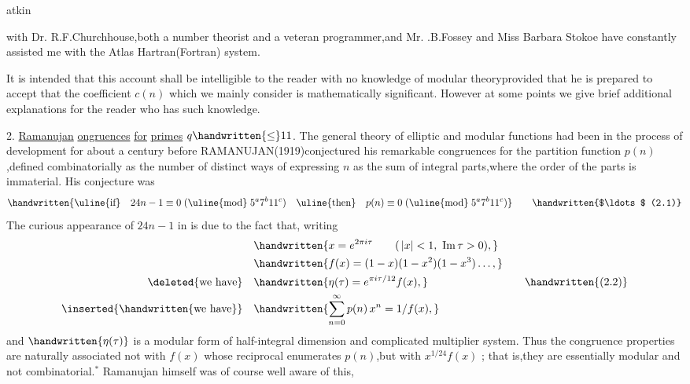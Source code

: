 \noindent\hfill atkin 

\noindent with Dr. R.F.Churchhouse,both a number theorist and a veteran programmer,and Mr. .B.Fossey and Miss Barbara Stokoe have constantly assisted me with the Atlas Hartran(Fortran) system.

It is intended that this account shall be intelligible to the reader with no knowledge of modular theory\deleted{;}provided that he is prepared to accept that the coefficient \uline{$c(n)$} which we mainly consider is mathematically significant. However at some points we give brief additional explanations for the reader who has such knowledge.

\noindent\margin{\handwritten{/}}2. \uline{Ramanujan} \uline{ongruences} \uline{for} \uline{primes} $q\handwritten{\leq}11$. The general theory of elliptic and modular functions had been in the process of development for about a century before RAMANUJAN(1919)conjectured his remarkable congruences for the partition function \uline{$p(n)$},defined combinatorially as the number of distinct ways of expressing \uline{$n$} as the sum of integral parts,where the order of the parts is immaterial. His conjecture was
\[
\handwritten{\text{\uline{if}}\quad 24n-1\equiv0\;(\text{\uline{mod}}\;5^{a}7^{b}11^{c})\quad
\text{\uline{then}}\quad p(n)\equiv0\;(\text{\uline{mod}}\;5^{a}7^{b}11^{c})}
\tag*{\handwritten{$\ldots$ (2.1)}}
\]
The curious appearance of $24n-1$ in  is due to the fact that, writing
\[
\begin{aligned}
&\handwritten{x=e^{2\pi i\tau}\qquad (\,|x|<1,\ \mathrm{Im}\,\tau>0),}\\
&\handwritten{f(x)=(1-x)(1-x^{2})(1-x^{3})\ldots,}\\
\text{\deleted{we have}}\quad &\handwritten{\eta(\tau)=e^{\pi i\tau/12}f(x),}\\
\text{\inserted{\handwritten{we have}}}\quad &\handwritten{\sum_{n=0}^{\infty}p(n)\,x^{n}=1/f(x),}
\end{aligned}
\tag*{\handwritten{(2.2)}}
\]
and $\handwritten{\eta(\tau)}$ is a modular form of half-integral dimension and complicated multiplier system. Thus the congruence properties are naturally associated not with \uline{$f(x)$} whose reciprocal enumerates \uline{$p(n)$},but with \uline{$x^{1/24}f(x)$} ; that is,they are essentially modular and not combinatorial.$^{*}$ Ramanujan himself was of course well aware of this,

